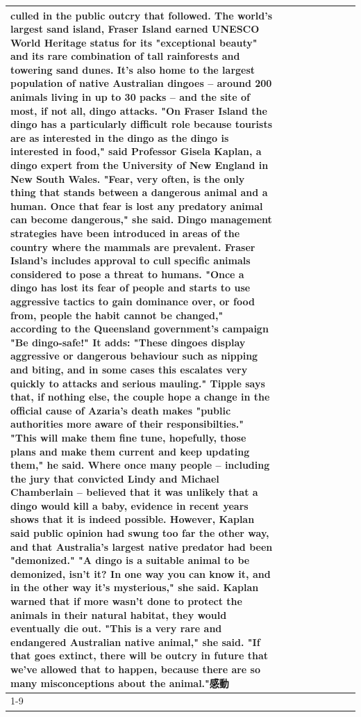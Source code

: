 \begin{table}[H]
\begin{tabular}{lllrlllll}
culled in the public outcry that followed. The world's largest sand island, Fraser Island earned UNESCO World Heritage status for its "exceptional beauty" and its rare combination of tall rainforests and towering sand dunes. It's also home to the largest population of native Australian dingoes -- around 200 animals living in up to 30 packs -- and the site of most, if not all, dingo attacks. "On Fraser Island the dingo has a particularly difficult role because tourists are as interested in the dingo as the dingo is interested in food," said Professor Gisela Kaplan, a dingo expert from the University of New England in New South Wales. "Fear, very often, is the only thing that stands between a dangerous animal and a human. Once that fear is lost any predatory animal can become dangerous," she said. Dingo management strategies have been introduced in areas of the country where the mammals are prevalent. Fraser Island's includes approval to cull specific animals considered to pose a threat to humans. "Once a dingo has lost its fear of people and starts to use aggressive tactics to gain dominance over, or food from, people the habit cannot be changed," according to the Queensland government's campaign "Be dingo-safe!" It adds: "These dingoes display aggressive or dangerous behaviour such as nipping and biting, and in some cases this escalates very quickly to attacks and serious mauling." Tipple says that, if nothing else, the couple hope a change in the official cause of Azaria's death makes "public authorities more aware of their responsibilties." "This will make them fine tune, hopefully, those plans and make them current and keep updating them," he said. Where once many people -- including the jury that convicted Lindy and Michael Chamberlain -- believed that it was unlikely that a dingo would kill a baby, evidence in recent years shows that it is indeed possible. However, Kaplan said public opinion had swung too far the other way, and that Australia's largest native predator had been "demonized." "A dingo is a suitable animal to be demonized, isn't it? In one way you can know it, and in the other way it's mysterious," she said. Kaplan warned that if more wasn't done to protect the animals in their natural habitat, they would eventually die out. "This is a very rare and endangered Australian native animal," she said. "If that goes extinct, there will be outcry in future that we've allowed that to happen, because there are so many misconceptions about the animal."感動 \\
\cline{1-9}

\end{tabular}
\end{table}
